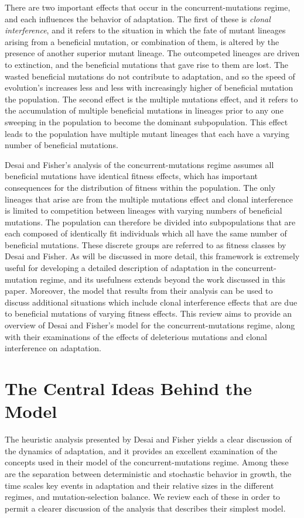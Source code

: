 \documentclass[12pt, one column]{article}
\begin{document}
There are two important effects that occur in the concurrent-mutations regime, and each influences the behavior of adaptation.  The first of these is \textit{clonal interference}, and it refers to the situation in which the fate of mutant lineages arising from a beneficial mutation, or combination of them, is altered by the presence of another superior mutant lineage.  The outcompeted lineages are driven to extinction, and the beneficial mutations that gave rise to them are lost.  The wasted beneficial mutations do not contribute to adaptation, and so the speed of evolution's increases less and less with increasingly higher  of beneficial mutation the population.  The second effect is the multiple mutations effect, and it refers to the accumulation of multiple beneficial mutations in lineages prior to any one sweeping in the population to become the dominant subpopulation.  This effect leads to the population have multiple mutant lineages that each have a varying number of beneficial mutations.    

Desai and Fisher's analysis of the concurrent-mutations regime assumes all beneficial mutations have identical fitness effects, which has important consequences for the distribution of fitness within the population.  The only lineages that arise are from the multiple mutations effect and clonal interference is limited to competition between lineages with varying numbers of beneficial mutations.  The population can therefore be divided into subpopulations that are each composed of identically fit individuals which all have the same number of beneficial mutations.  These discrete groups are referred to as fitness classes by Desai and Fisher.  As will be discussed in more detail, this framework is extremely useful for developing a detailed description of adaptation in the concurrent-mutation regime, and its usefulness extends beyond the work discussed in this paper.  Moreover, the model that results from their analysis can be used to discuss additional situations which include clonal interference effects that are due to beneficial mutations of varying fitness effects.  This review aims to provide an overview of Desai and Fisher's model for the concurrent-mutations regime, along with their examinations of the effects of deleterious mutations and clonal interference on adaptation.

\section*{The Central Ideas Behind the Model}
The heuristic analysis presented by Desai and Fisher yields a clear discussion of the dynamics of adaptation, and it provides an excellent examination of the concepts used in their model of the concurrent-mutations regime.  Among these are the separation between deterministic and stochastic behavior in growth, the time scales key events in adaptation and their relative sizes in the different regimes, and mutation-selection balance.  We review each of these in order to permit a clearer discussion of the analysis that describes their simplest model.     
\end{document}
